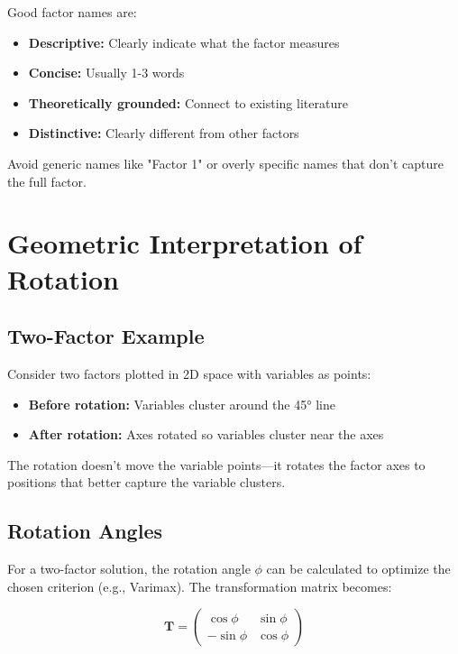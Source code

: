\documentclass[a4paper]{tufte-book}
\begin{document}
\begin{learningtip}
Good factor names are:
\begin{itemize}
\item \textbf{Descriptive:} Clearly indicate what the factor measures
\item \textbf{Concise:} Usually 1-3 words
\item \textbf{Theoretically grounded:} Connect to existing literature
\item \textbf{Distinctive:} Clearly different from other factors
\end{itemize}

Avoid generic names like "Factor 1" or overly specific names that don't capture the full factor.
\end{learningtip}

\section{Geometric Interpretation of Rotation}

\subsection{Two-Factor Example}

Consider two factors plotted in 2D space with variables as points:

\begin{itemize}
\item \textbf{Before rotation:} Variables cluster around the 45° line
\item \textbf{After rotation:} Axes rotated so variables cluster near the axes
\end{itemize}

The rotation doesn't move the variable points—it rotates the factor axes to positions that better capture the variable clusters.

\subsection{Rotation Angles}

For a two-factor solution, the rotation angle $\phi$ can be calculated to optimize the chosen criterion (e.g., Varimax). The transformation matrix becomes:

$$\mathbf{T} = \begin{pmatrix}
\cos\phi & \sin\phi \\
-\sin\phi & \cos\phi
\end{pmatrix}$$
\end{document}

